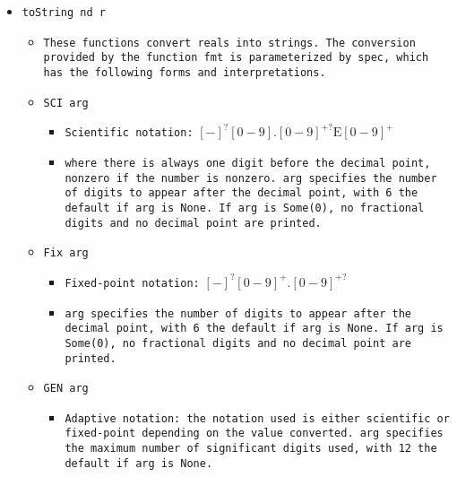 \documentclass[11pt]{report}
\begin{document}
\begin{itemize}
\begin{itemize}
\item  \texttt{toString nd r}

\begin{itemize}
\item \begin{flushleft} \texttt{These functions convert reals into strings. The conversion provided by the function fmt is parameterized by spec, which has the following forms and interpretations.} \end{flushleft}

\item  \texttt{SCI arg}

\begin{itemize}
\item  \texttt{Scientific notation:} $[-]^?[0-9].[0-9]^{+?}\text{E}[0-9]^+$
\item  \begin{flushleft} \texttt{where there is always one digit before the decimal point, nonzero if the number is nonzero. arg specifies the number of digits to appear after the decimal point, with 6 the default if arg is None. If arg is Some(0), no fractional digits and no decimal point are printed.}\end{flushleft}

\end{itemize}

\item  \texttt{Fix arg}

\begin{itemize}
\item  \texttt{Fixed-point notation:} $[-]^?[0-9]^+.[0-9]^{+?}$


\item  \begin{flushleft}\texttt{arg specifies the number of digits to appear after the decimal point, with 6 the default if arg is None. If arg is Some(0), no fractional digits and no decimal point are printed. } \end{flushleft}

\end{itemize}

\item  \texttt{GEN arg}

\begin{itemize}
\item  \begin{flushleft} \texttt{Adaptive notation: the notation used is either scientific or fixed-point depending on the value converted. arg specifies the maximum number of significant digits used, with 12 the default if arg is None.} \end{flushleft}




\end{itemize}
\end{itemize}
\end{itemize}
\end{itemize}
\end{document}
